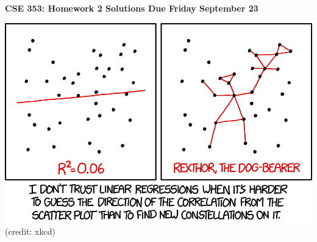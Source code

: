 \documentclass{article}
\newcommand{\mypagebreak}{\begin{center}
		\noindent\makebox[\linewidth]{\rule{7.5in}{1pt}}
	\end{center}}
\begin{document}
{\Large\textbf{CSE 353: Homework  2 Solutions \hfill
Due Friday September 23}}


\mypagebreak



\begin{center}
\includegraphics[width=.5\linewidth]{figs/overfit.png}\\
(credit: xkcd)
\end{center}
\end{document}
